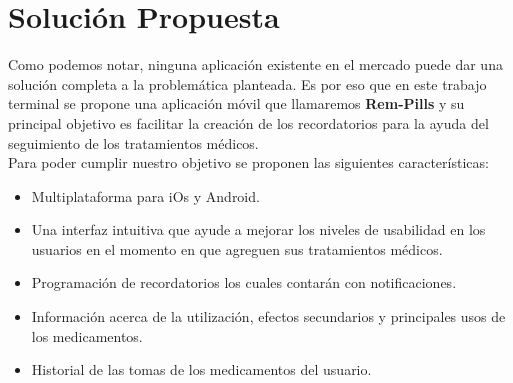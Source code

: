 \section{Solución Propuesta}
Como podemos notar, ninguna aplicación existente en el mercado puede dar una solución completa a la problemática planteada.
Es por eso que en este trabajo terminal se propone una aplicación móvil que llamaremos \textbf{Rem-Pills} y su principal objetivo es facilitar la creación de los recordatorios para la ayuda del seguimiento de los tratamientos médicos.\\
Para poder cumplir nuestro objetivo se proponen las siguientes características:
\begin{itemize}
	\item Multiplataforma para iOs y Android.
	
	\item Una interfaz intuitiva que ayude a mejorar los niveles de usabilidad en los usuarios en el momento en que agreguen sus tratamientos médicos.
	
	\item Programación de recordatorios los cuales contarán con notificaciones.
	
	
	\item Información acerca de la utilización, efectos secundarios y principales usos de los medicamentos.
	
	\item Historial de las tomas de los medicamentos del usuario.
	
	
\end{itemize}



